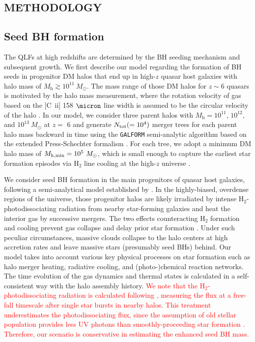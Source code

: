 \documentclass[twocolumn, twocolappendix]{aastex63}
\newcommand{\Msun}{M_\odot}
\newcommand{\Mh}{M_\mathrm{h}}
\newcommand{\red}[1]{\textcolor{red}{ #1}}
\begin{document}
\begin{CJK*}{UTF8}{gbsn}
\vspace{2mm}
\section{METHODOLOGY}\label{sec:method}

\vspace{2mm}
\subsection{Seed BH formation}\label{sec:seed}
The QLFs at high redshifts are determined by the BH seeding mechanism and subsequent growth. 
We first describe our model regarding the formation of BH seeds in progenitor DM halos 
that end up in high-$z$ quasar host galaxies with halo mass of $\Mh \gtrsim 10^{11}~\Msun$.
The mass range of those DM halos for $z\sim 6$ quasars is motivated by the halo mass measurement, 
where the rotation velocity of gas based on the [C~{\sc ii}] 158 $\micron$ line width is assumed to be the circular velocity of the halo
\citep{2002ApJ...578...90F,2013ApJ...773...44W,2019ApJ...872L..29S}.
In our model, we consider three parent halos with $\Mh = 10^{11}$, $10^{12}$, and $10^{13} ~\Msun$ at $z=$ 6
and generate $N_{\rm tot} (= 10^4)$ merger trees for each parent halo mass backward in time using the {\tt GALFORM} 
semi-analytic algorithm based on the extended Press-Schechter formalism 
\citep{1974ApJ...187..425P,2000MNRAS.319..168C,2008MNRAS.383..557P}.
For each tree, we adopt a minimum DM halo mass of $M_{\rm h,min}=10^5~\Msun$, which is small enough to capture 
the earliest star formation episodes via H$_2$ line cooling at the high-$z$ universe \citep{1996ApJ...464..523H,1997ApJ...474....1T}.


We consider seed BH formation in the main progenitors of quasar host galaxies, following a semi-analytical model established by \citet{2021ApJ...917...60L}.
In the highly-biased, overdense regions of the universe, those progenitor halos are likely irradiated by intense H$_2$-photodissociating radiation 
from nearby star-forming galaxies and heat the interior gas by successive mergers. 
The two effects counteracting H$_2$ formation and cooling prevent gas collapse and delay prior star formation \citep[e.g.,][]{2014MNRAS.445..107V,2019Natur.566...85W}.
Under such peculiar circumstances, massive clouds collapse to the halo centers at high accretion rates and leave massive stars (presumably seed BHs) behind.
Our model takes into account various key physical processes on star formation such as halo merger heating, radiative cooling, and
(photo-)chemical reaction networks.
The time evolution of the gas dynamics and thermal states is calculated in a self-consistent way with the halo assembly history.
\red{
We note that the H$_2$-photodissociating radiation is calculated following \citet{2014MNRAS.442.2036D},
measuring the flux at a free-fall timescale after single star bursts in nearby halos. 
This treatment underestimates the photodissociating flux, since the assumption of old stellar population provides less UV photons than smoothly-proceeding star formation
\citep{2021MNRAS.503.5046L}.
Therefore, our scenario is conservative in estimating the enhanced seed BH mass.
}



\end{CJK*}
\end{document}
